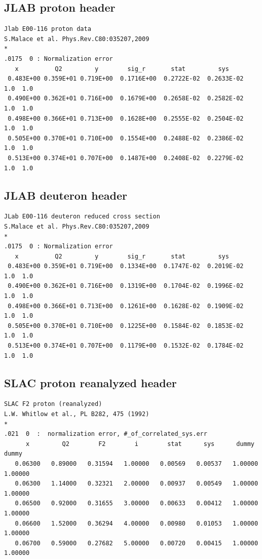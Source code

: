 \documentclass[12pt,a4paper]{report}
\begin{document}
\subsection{JLAB proton \cite{JLAB} header}

\begin{Verbatim}[fontsize=\small]
Jlab E00-116 proton data 
S.Malace et al. Phys.Rev.C80:035207,2009
*
.0175  0 : Normalization error
   x          Q2         y        sig_r       stat         sys  
 0.483E+00 0.359E+01 0.719E+00  0.1716E+00  0.2722E-02  0.2633E-02  1.0  1.0
 0.490E+00 0.362E+01 0.716E+00  0.1679E+00  0.2658E-02  0.2582E-02  1.0  1.0
 0.498E+00 0.366E+01 0.713E+00  0.1628E+00  0.2555E-02  0.2504E-02  1.0  1.0
 0.505E+00 0.370E+01 0.710E+00  0.1554E+00  0.2488E-02  0.2386E-02  1.0  1.0
 0.513E+00 0.374E+01 0.707E+00  0.1487E+00  0.2408E-02  0.2279E-02  1.0  1.0
\end{Verbatim}

\subsection{JLAB deuteron \cite{JLAB} header}

\begin{Verbatim}[fontsize=\small]
JLab E00-116 deuteron reduced cross section 
S.Malace et al. Phys.Rev.C80:035207,2009
*
.0175  0 : Normalization error
   x          Q2         y        sig_r       stat         sys   
 0.483E+00 0.359E+01 0.719E+00  0.1334E+00  0.1747E-02  0.2019E-02  1.0  1.0
 0.490E+00 0.362E+01 0.716E+00  0.1319E+00  0.1704E-02  0.1996E-02  1.0  1.0
 0.498E+00 0.366E+01 0.713E+00  0.1261E+00  0.1628E-02  0.1909E-02  1.0  1.0
 0.505E+00 0.370E+01 0.710E+00  0.1225E+00  0.1584E-02  0.1853E-02  1.0  1.0
 0.513E+00 0.374E+01 0.707E+00  0.1179E+00  0.1532E-02  0.1784E-02  1.0  1.0
\end{Verbatim}

\subsection{SLAC proton \cite{Whitlow} reanalyzed header}

\begin{Verbatim}[fontsize=\small]
SLAC F2 proton (reanalyzed)
L.W. Whitlow et al., PL B282, 475 (1992)
*
.021  0  :  normalization error, #_of_correlated_sys.err
      x         Q2        F2        i        stat      sys      dummy     dummy
   0.06300   0.89000   0.31594   1.00000   0.00569   0.00537   1.00000   1.00000
   0.06300   1.14000   0.32321   2.00000   0.00937   0.00549   1.00000   1.00000
   0.06500   0.92000   0.31655   3.00000   0.00633   0.00412   1.00000   1.00000
   0.06600   1.52000   0.36294   4.00000   0.00980   0.01053   1.00000   1.00000
   0.06700   0.59000   0.27682   5.00000   0.00720   0.00415   1.00000   1.00000
\end{Verbatim}
\end{document}
